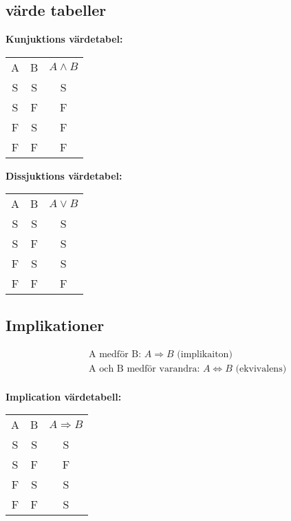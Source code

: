 \documentclass{article}
\begin{document}
\subsection{värde tabeller}
\textbf{Kunjuktions värdetabel:}\par
\begin{center}
\begin{tabular}{ |c|c|c| } 
 \hline
 A  & B  & \(A \land B\) \\ 
 S  & S  & S          \\ 
 S  & F  & F          \\  
 F  & S  & F          \\ 
 F  & F  & F          \\ 
 \hline
\end{tabular}
\end{center}

\textbf{Dissjuktions värdetabel:}\par
\begin{center}
\begin{tabular}{ |c|c|c| } 
 \hline
 A  & B  & \(A \lor B\) \\ 
 S  & S  & S          \\ 
 S  & F  & S          \\  
 F  & S  & S          \\ 
 F  & F  & F          \\ 
 \hline
\end{tabular}
\end{center}



\subsection{Implikationer}
\begin{align*}
  &\quad \text{A medför B: } A \Rightarrow B \text{ (implikaiton)} \\
  &\quad \text{A och B medför varandra: } A \Leftrightarrow B \text{ (ekvivalens)} \\
\end{align*}

\newpage
\textbf{Implication värdetabell:}\par
\begin{center}
\begin{tabular}{ |c|c|c| } 
 \hline
 A  & B  & \(A \Rightarrow B\) \\ 
 S  & S  & S          \\ 
 S  & F  & F          \\  
 F  & S  & S          \\ 
 F  & F  & S          \\ 
 \hline
\end{tabular}
\end{center}
\end{document}
